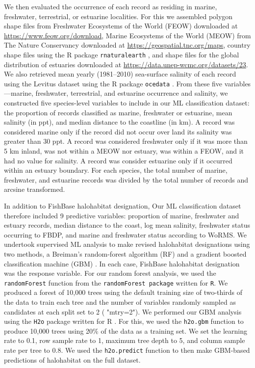 \documentclass[11pt]{article}
\begin{document}
We then evaluated the occurrence of each record as residing in marine, freshwater, terrestrial, or estuarine localities. For this we assembled polygon shape files from Freshwater Ecosystems of the World (FEOW) \citep{abell2008freshwater} downloaded at \url{https://www.feow.org/download}, Marine Ecosystems of the World (MEOW) from The Nature Conservancy \citep{spalding2007marine} downloaded at \url{https://geospatial.tnc.org/maps}, country shape files using the R package \texttt{rnaturalearth} \citep{naturalearth}, and shape files for the global distribution of estuaries \citep{alder2003putting} downloaded at \url{https://data.unep-wcmc.org/datasets/23}. We also retrieved mean yearly (1981--2010) sea-surface salinity of each record using the Levitus dataset \citep{garcia2013world} using the R package \texttt{ocedata} \citep{ocedata}. From these five variables---marine, freshwater, terrestrial, and estuarine occurrence and salinity, we constructed five species-level variables to include in our ML classification dataset: the proportion of records classified as marine, freshwater or estuarine, mean salinity (in ppt), and median distance to the coastline (in km). A record was considered marine only if the record did not occur over land its salinity was greater than 30 ppt. A record was considered freshwater only if it was more than 5 km inland, was not within a MEOW nor estuary, was within a FEOW, and it had no value for salinity. A record was consider estuarine only if it occurred within an estuary boundary. For each species, the total number of marine, freshwater, and estuarine records was divided by the total number of records and arcsine transformed. 

In addition to FishBase halohabitat designation, Our ML classification dataset therefore included 9 predictive variables: proportion of marine, freshwater and estuary records, median distance to the coast, log mean salinity, freshwater status occurring to FBDP, and marine and freshwater status according to WoRMS.  We undertook  supervised ML analysis to make revised halohabitat designations using two methods, a Breiman's random-forest algorithm (RF) \citep{breiman2001random} and a gradient boosted classification machine (GBM) \citep{friedman2001greedy}. In each case, FishBase halohabitat designation was the response variable. For our random forest analysis, we used the \texttt{randomForest} function from the  \texttt{randomForest package} \citep{r} written for \texttt{R}. We produced a forest of 10,000 trees using the default training size of two-thirds of the data to train each tree and the number of variables randomly sampled as candidates at each split set to 2 ( "mtry=2"). We performed our GBM analysis using the \texttt{H2o} package written for R \citep{h2o}. For this, we used the \texttt{h2o.gbm} function to produce 10,000 trees using 20\% of the data as a training set. We set the learning rate to 0.1, row sample rate to 1, maximum tree depth to 5, and column sample rate per tree to 0.8. We used the \texttt{h2o.predict} function to then make GBM-based predictions of halohabitat on the full dataset.
\end{document}
